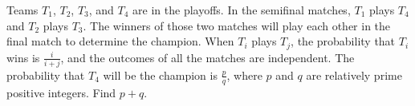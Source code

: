 Teams $T_1$, $T_2$, $T_3$, and $T_4$ are in the playoffs. In the semifinal matches, $T_1$ plays $T_4$ and $T_2$ plays $T_3$. The winners of those two matches will play each other in the final match to determine the champion. When $T_i$ plays $T_j$, the probability that $T_i$ wins is $\frac{i}{i+j}$, and the outcomes of all the matches are independent. The probability that $T_4$ will be the champion is $\frac{p}{q}$, where $p$ and $q$ are relatively prime positive integers. Find $p+q$.